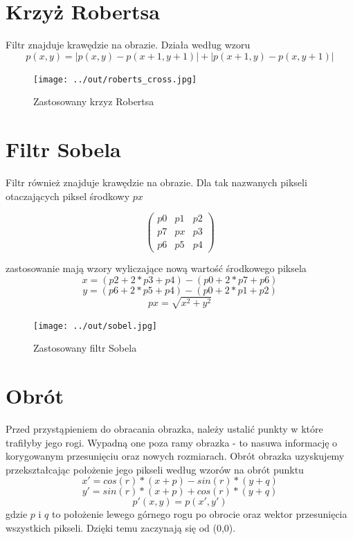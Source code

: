 \documentclass[a4paper,12pt]{article}
\begin{document}
\newpage
\section{Krzyż Robertsa}
Filtr znajduje krawędzie na obrazie. Działa według wzoru
$$p(x,y) = |p(x,y)-p(x+1,y+1)| + |p(x+1,y)-p(x,y+1)|$$



\begin{figure}[h!]
   \centering
   \texttt{[image: ../out/roberts\_cross.jpg]}
   \caption{Zastosowany krzyz Robertsa}
\end{figure}



\newpage
\section{Filtr Sobela}
Filtr również znajduje krawędzie na obrazie. Dla tak nazwanych pikseli otaczających piksel środkowy $px$
\begin{center}
\[ \left( \begin{array}{ccc}
p0 & p1 & p2 \\
p7 & px & p3 \\
p6 & p5 & p4 \end{array} \right)\] 
\end{center}
zastosowanie mają wzory wyliczające nową wartość środkowego piksela
$$x = (p2+2*p3+p4)-(p0+2*p7+p6)$$
$$y = (p6+2*p5+p4)-(p0+2*p1+p2)$$
$$px = \sqrt{x^2 + y^2}$$



\begin{figure}[h!]
   \centering
   \texttt{[image: ../out/sobel.jpg]}
   \caption{Zastosowany filtr Sobela}
\end{figure}



\newpage
\section{Obrót}
Przed przystąpieniem do obracania obrazka, należy ustalić punkty w które trafiłyby jego rogi. Wypadną one poza ramy obrazka - to nasuwa informację o korygowanym przesunięciu oraz nowych rozmiarach.
Obrót obrazka uzyskujemy przekształcając położenie jego pikseli według wzorów na obrót punktu
$$x' = cos(r)*(x+p) - sin(r)*(y+q)$$
$$y' = sin(r)*(x+p) + cos(r)*(y+q)$$
$$p'(x,y) = p(x', y')$$
gdzie $p$ i $q$ to położenie lewego górnego rogu po obrocie oraz wektor przesunięcia wszystkich pikseli. Dzięki temu zaczynają się od (0,0).
\end{document}
